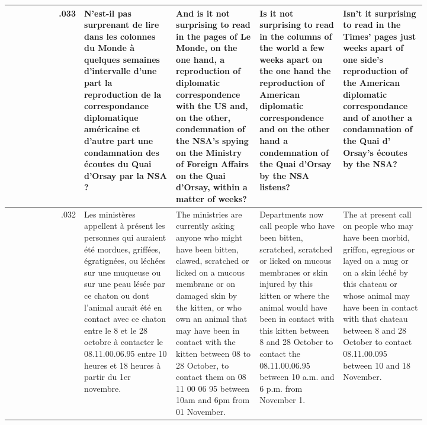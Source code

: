 \begin{table}[ht]
\begin{tabular}{r @{\hspace{2mm}} p{0.22\linewidth}p{0.20\linewidth}p{0.20\linewidth}p{0.20\linewidth}}
.033 & N'est-il pas surprenant de lire dans les colonnes du Monde à quelques semaines d'intervalle d'une part la reproduction de la correspondance diplomatique américaine et d'autre part une condamnation des écoutes du Quai d'Orsay par la NSA ? & And is it not surprising to read in the pages of Le Monde, on the one hand, a reproduction of diplomatic correspondence with the US and, on the other, condemnation of the NSA's spying on the Ministry of Foreign Affairs on the Quai d'Orsay, within a matter of weeks? & Is it not surprising to read in the columns of the world a few weeks apart on the one hand the reproduction of American diplomatic correspondence and on the other hand a condemnation of the Quai d'Orsay by the NSA listens? & Isn't it surprising to read in the Times' pages just weeks apart of one side's reproduction of the American diplomatic correspondance and of another a condamnation of the Quai d' Orsay's écoutes by the NSA? \\\hline
.032 & Les ministères appellent à présent les personnes qui auraient été mordues, griffées, égratignées, ou léchées sur une muqueuse ou sur une peau lésée par ce chaton ou dont l'animal aurait été en contact avec ce chaton entre le 8 et le 28 octobre à contacter le 08.11.00.06.95 entre 10 heures et 18 heures à partir du 1er novembre. & The ministries are currently asking anyone who might have been bitten, clawed, scratched or licked on a mucous membrane or on damaged skin by the kitten, or who own an animal that may have been in contact with the kitten between 08 to 28 October, to contact them on 08 11 00 06 95 between 10am and 6pm from 01 November. & Departments now call people who have been bitten, scratched, scratched or licked on mucous membranes or skin injured by this kitten or where the animal would have been in contact with this kitten between 8 and 28 October to contact the 08.11.00.06.95 between 10 a.m. and 6 p.m. from November 1. & The at present call on people who may have been morbid, griffon, egregious or layed on a mug or on a skin léché by this chateau or whose animal may have been in contact with that chateau between 8 and 28 October to contact 08.11.00.095 between 10 and 18 November. \\\hline

\end{tabular}
\end{table}
